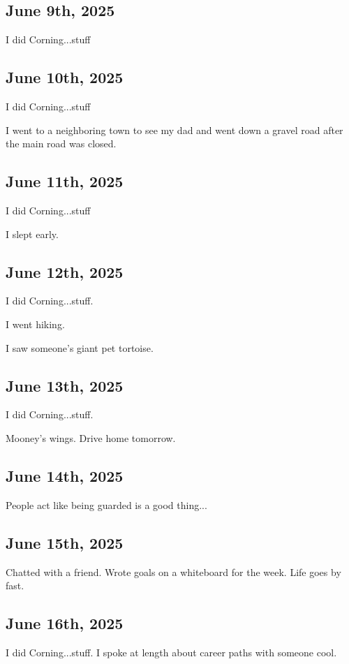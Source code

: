 \documentclass{article}
\begin{document}
\subsection{June 9th, 2025}
I did Corning...stuff 

\subsection{June 10th, 2025}
I did Corning...stuff 

I went to a neighboring town to see my dad and went down a gravel road after the main road was closed.


\subsection{June 11th, 2025}
I did Corning...stuff

I slept early. 

\subsection{June 12th, 2025}
I did Corning...stuff. 

I went hiking. 

I saw someone's giant pet tortoise. 

\subsection{June 13th, 2025}
I did Corning...stuff. 

Mooney's wings. Drive home tomorrow. 

\subsection{June 14th, 2025}
People act like being guarded is a good thing...

\subsection{June 15th, 2025}
Chatted with a friend. Wrote goals on a whiteboard for the week. Life goes by fast. 

\subsection{June 16th, 2025}
I did Corning...stuff. 
I spoke at length about career paths with someone cool. 
\end{document}
